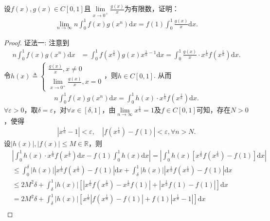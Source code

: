 \documentclass[../../main.tex]{subfiles}
\begin{document}
\begin{example}
设$f(x),g(x)\in C[0,1]$且$\lim\limits_{x\rightarrow 0^+}\frac{g(x)}{x}$为有限数，证明：
\begin{align*}
\lim\limits_{n\rightarrow \infty}n\int_0^1 f(x)g(x^n)\mathrm{d}x=f(1)\int_0^1 \frac{g(x)}{x}\mathrm{d}x.
\end{align*}
\end{example}
\begin{proof}
{\color{blue}证法一:}
注意到
\begin{align*}
n\int_0^1 f(x)g(x^n)\mathrm{d}x&=\int_0^1 f\left(x^{\frac{1}{n}}\right)g(x)x^{\frac{1}{n}-1}\mathrm{d}x=\int_0^1 \frac{g(x)}{x}\cdot x^{\frac{1}{n}}f\left(x^{\frac{1}{n}}\right)\mathrm{d}x.
\end{align*}
令$h(x)\triangleq \begin{cases}
\frac{g(x)}{x},x\ne 0\\
\lim\limits_{x\rightarrow 0^+}\frac{g(x)}{x},x=0
\end{cases}$，则$h\in C[0,1]$. 从而
\begin{align*}
n\int_0^1 f(x)g(x^n)\mathrm{d}x=\int_0^1 h(x)\cdot x^{\frac{1}{n}}f\left(x^{\frac{1}{n}}\right)\mathrm{d}x.
\end{align*}
$\forall \varepsilon >0$，取$\delta =\varepsilon$，对$\forall x\in [\delta,1]$，由$\lim\limits_{n\rightarrow \infty}x^{\frac{1}{n}}=1$及$f\in C[0,1]$可知，存在$N>0$，使得
\begin{align*}
\left|x^{\frac{1}{n}}-1\right|<\varepsilon,\quad \left|f\left(x^{\frac{1}{n}}\right)-f(1)\right|<\varepsilon,\forall n>N.
\end{align*}
设$\left|h(x)\right|,\left|f(x)\right|\leqslant M\in \mathbb{R}$，则
\begin{align*}
&\left|\int_0^1 h(x)\cdot x^{\frac{1}{n}}f\left(x^{\frac{1}{n}}\right)\mathrm{d}x-f(1)\int_0^1 h(x)\mathrm{d}x\right|=\left|\int_0^1 h(x)\left[x^{\frac{1}{n}}f\left(x^{\frac{1}{n}}\right)-f(1)\right]\mathrm{d}x\right|\\
&\leqslant \int_0^{\delta}\left|h(x)\right|\left|x^{\frac{1}{n}}f\left(x^{\frac{1}{n}}\right)-f(1)\right|\mathrm{d}x+\int_{\delta}^1\left|h(x)\right|\left|x^{\frac{1}{n}}f\left(x^{\frac{1}{n}}\right)-f(1)\right|\mathrm{d}x\\
&\leqslant 2M^2\delta+\int_{\delta}^1\left|h(x)\right|\left[\left|x^{\frac{1}{n}}f\left(x^{\frac{1}{n}}\right)-x^{\frac{1}{n}}f(1)\right|+\left|x^{\frac{1}{n}}f(1)-f(1)\right|\right]\mathrm{d}x\\
&=2M^2\delta+\int_{\delta}^1\left|h(x)\right|\left[x^{\frac{1}{n}}\left|f\left(x^{\frac{1}{n}}\right)-f(1)\right|+f(1)\left|x^{\frac{1}{n}}-1\right|\right]\mathrm{d}x\\

\end{align*}
\end{proof}
\end{document}
